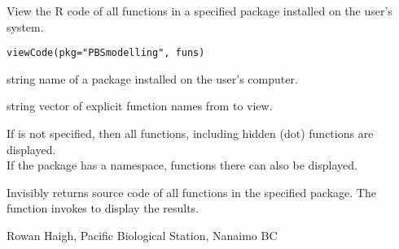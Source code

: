 \documentclass[letterpaper]{book}
\begin{document}
\begin{Description}\relax
View the R code of all functions in a specified package 
installed on the user's system.
\end{Description}
\begin{Usage}
\begin{verbatim}
viewCode(pkg="PBSmodelling", funs)
\end{verbatim}
\end{Usage}
\begin{Arguments}
\begin{ldescription}
\item[\code{pkg}] string name of a package installed on the user's computer. 
\item[\code{funs}] string vector of explicit function names from  to view. 
\end{ldescription}
\end{Arguments}
\begin{Details}\relax
If  is not specified, then all functions, including
hidden (dot) functions are displayed. \\
If the package has a namespace, functions there can also be displayed.
\end{Details}
\begin{Value}
Invisibly returns source code of all functions in the specified package.
The function invokes  to display the results.
\end{Value}
\begin{Author}\relax
Rowan Haigh, Pacific Biological Station, Nanaimo BC
\end{Author}
\end{document}
